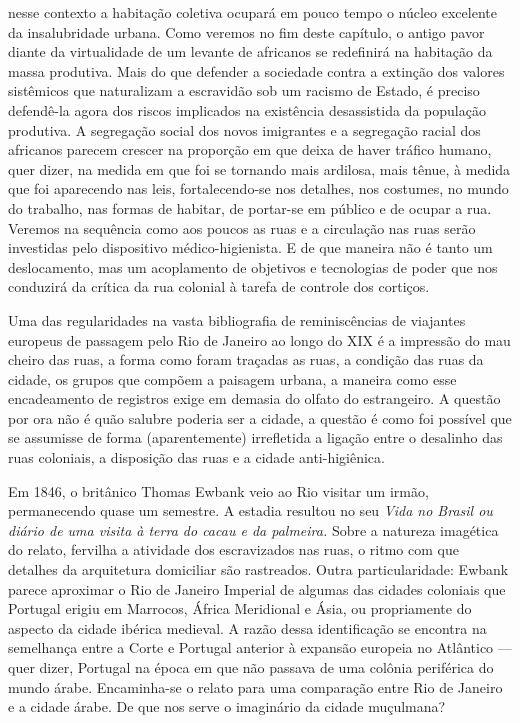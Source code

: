 nesse contexto a habitação coletiva ocupará em pouco tempo o núcleo
excelente da insalubridade urbana. Como veremos no fim deste capítulo, o
antigo pavor diante da virtualidade de um levante de africanos se
redefinirá na habitação da massa produtiva. Mais do que defender a
sociedade contra a extinção dos valores sistêmicos que naturalizam a
escravidão sob um racismo de Estado, é preciso defendê-la agora dos
riscos implicados na existência desassistida da população produtiva. A
segregação social dos novos imigrantes e a segregação racial dos
africanos parecem crescer na proporção em que deixa de haver tráfico
humano, quer dizer, na medida em que foi se tornando mais ardilosa, mais
tênue, à medida que foi aparecendo nas leis, fortalecendo-se nos
detalhes, nos costumes, no mundo do trabalho, nas formas de habitar, de
portar-se em público e de ocupar a rua. Veremos na sequência como aos
poucos as ruas e a circulação nas ruas serão investidas pelo dispositivo
médico-higienista. E de que maneira não é tanto um deslocamento, mas um
acoplamento de objetivos e tecnologias de poder que nos conduzirá da
crítica da rua colonial à tarefa de controle dos cortiços.

Uma das regularidades na vasta bibliografia de reminiscências de
viajantes europeus de passagem pelo Rio de Janeiro ao longo do XIX é a
impressão do mau cheiro das ruas, a forma como foram traçadas as ruas, a
condição das ruas da cidade, os grupos que compõem a paisagem urbana, a
maneira como esse encadeamento de registros exige em demasia do olfato
do estrangeiro. A questão por ora não é quão salubre poderia ser a
cidade, a questão é como foi possível que se assumisse de forma
(aparentemente) irrefletida a ligação entre o desalinho das ruas
coloniais, a disposição das ruas e a cidade anti-higiênica.

Em 1846, o britânico Thomas Ewbank veio ao Rio visitar um irmão,
permanecendo quase um semestre. A estadia resultou no seu \textit{Vida no
Brasil ou diário de uma visita à terra do cacau e da palmeira.} Sobre a
natureza imagética do relato, fervilha a atividade dos escravizados nas
ruas, o ritmo com que detalhes da arquitetura domiciliar são rastreados.
Outra particularidade: Ewbank parece aproximar o Rio de Janeiro Imperial
de algumas das cidades coloniais que Portugal erigiu em Marrocos, África
Meridional e Ásia, ou propriamente do aspecto da cidade ibérica
medieval. A razão dessa identificação se encontra na semelhança entre a
Corte e Portugal anterior à expansão europeia no Atlântico --- quer
dizer, Portugal na época em que não passava de uma colônia periférica do
mundo árabe. Encaminha-se o relato para uma comparação entre Rio de
Janeiro e a cidade árabe. De que nos serve o imaginário da cidade
muçulmana?

